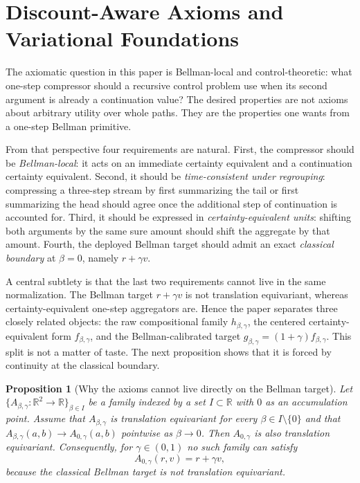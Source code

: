 \documentclass{article}
\newtheorem{proposition}[proposition]{Proposition}
\theoremstyle{remark}
\newcommand{\R}{\mathbb{R}}
\begin{document}
\newpage

\section{Discount-Aware Axioms and Variational Foundations}
\label{sec:axioms}
The axiomatic question in this paper is Bellman-local and control-theoretic: what one-step compressor should a recursive control problem use when its second argument is already a continuation value? The desired properties are not axioms about arbitrary utility over whole paths. They are the properties one wants from a one-step Bellman primitive.

From that perspective four requirements are natural. First, the compressor should be \emph{Bellman-local}: it acts on an immediate certainty equivalent and a continuation certainty equivalent. Second, it should be \emph{time-consistent under regrouping}: compressing a three-step stream by first summarizing the tail or first summarizing the head should agree once the additional step of continuation is accounted for. Third, it should be expressed in \emph{certainty-equivalent units}: shifting both arguments by the same sure amount should shift the aggregate by that amount. Fourth, the deployed Bellman target should admit an exact \emph{classical boundary} at $\beta=0$, namely $r+\gamma v$.

A central subtlety is that the last two requirements cannot live in the same normalization. The Bellman target $r+\gamma v$ is not translation equivariant, whereas certainty-equivalent one-step aggregators are. Hence the paper separates three closely related objects: the raw compositional family $h_{\beta,\gamma}$, the centered certainty-equivalent form $f_{\beta,\gamma}$, and the Bellman-calibrated target $g_{\beta,\gamma}=(1+\gamma)f_{\beta,\gamma}$. This split is not a matter of taste. The next proposition shows that it is forced by continuity at the classical boundary.

\begin{proposition}[Why the axioms cannot live directly on the Bellman target]
\label{prop:no-single-normalization}
Let $\{A_{\beta,\gamma}:\R^2\to\R\}_{\beta\in I}$ be a family indexed by a set $I\subset\R$ with $0$ as an accumulation point. Assume that $A_{\beta,\gamma}$ is translation equivariant for every $\beta\in I\setminus\{0\}$ and that $A_{\beta,\gamma}(a,b)\to A_{0,\gamma}(a,b)$ pointwise as $\beta\to 0$. Then $A_{0,\gamma}$ is also translation equivariant. Consequently, for $\gamma\in(0,1)$ no such family can satisfy
\[
A_{0,\gamma}(r,v)=r+\gamma v,
\]
because the classical Bellman target is not translation equivariant.
\end{proposition}
\end{document}
